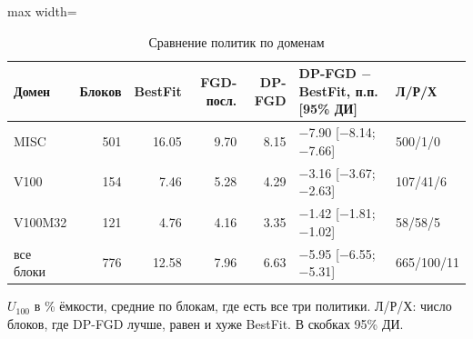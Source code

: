 \begin{table}[htbp]
\centering
\small
\caption{Сравнение политик по доменам}
\label{tab:mixedmain}
\begin{adjustbox}{max width=\textwidth}
\begin{tabular}{lrrrrll}
\toprule
Домен & Блоков & BestFit & FGD-посл. & DP-FGD & DP-FGD \(-\) BestFit, п.п. [95\% ДИ] & Л/Р/Х \\
\midrule
MISC & 501 & 16.05 & 9.70 & 8.15 & \(-\)7.90 [\(-\)8.14; \(-\)7.66] & 500/1/0 \\
V100 & 154 & 7.46 & 5.28 & 4.29 & \(-\)3.16 [\(-\)3.67; \(-\)2.63] & 107/41/6 \\
V100M32 & 121 & 4.76 & 4.16 & 3.35 & \(-\)1.42 [\(-\)1.81; \(-\)1.02] & 58/58/5 \\
\midrule
все блоки & 776 & 12.58 & 7.96 & 6.63 & \(-\)5.95 [\(-\)6.55; \(-\)5.31] & 665/100/11 \\
\bottomrule
\end{tabular}
\end{adjustbox}
\par\smallskip
\parbox{0.95\textwidth}{\footnotesize \(U_{100}\) в \% ёмкости, средние по блокам, где есть все три политики. Л/Р/Х: число блоков, где DP-FGD лучше, равен и хуже BestFit. В скобках 95\% ДИ.}
\end{table}
